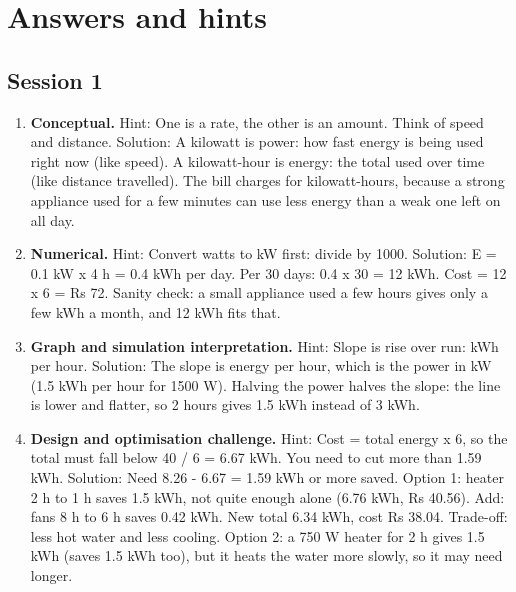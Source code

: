 \documentclass[11pt,a4paper]{article}
\begin{document}
\section{Answers and hints}

\subsection*{Session 1}
\begin{enumerate}[nosep]
\item \textbf{Conceptual.} Hint: One is a rate, the other is an amount. Think of speed and distance. Solution: A kilowatt is power: how fast energy is being used right now (like speed). A kilowatt-hour is energy: the total used over time (like distance travelled). The bill charges for kilowatt-hours, because a strong appliance used for a few minutes can use less energy than a weak one left on all day.
\item \textbf{Numerical.} Hint: Convert watts to kW first: divide by 1000. Solution: E = 0.1 kW x 4 h = 0.4 kWh per day. Per 30 days: 0.4 x 30 = 12 kWh. Cost = 12 x 6 = Rs 72. Sanity check: a small appliance used a few hours gives only a few kWh a month, and 12 kWh fits that.
\item \textbf{Graph and simulation interpretation.} Hint: Slope is rise over run: kWh per hour. Solution: The slope is energy per hour, which is the power in kW (1.5 kWh per hour for 1500 W). Halving the power halves the slope: the line is lower and flatter, so 2 hours gives 1.5 kWh instead of 3 kWh.
\item \textbf{Design and optimisation challenge.} Hint: Cost = total energy x 6, so the total must fall below 40 / 6 = 6.67 kWh. You need to cut more than 1.59 kWh. Solution: Need 8.26 - 6.67 = 1.59 kWh or more saved. Option 1: heater 2 h to 1 h saves 1.5 kWh, not quite enough alone (6.76 kWh, Rs 40.56). Add: fans 8 h to 6 h saves 0.42 kWh. New total 6.34 kWh, cost Rs 38.04. Trade-off: less hot water and less cooling. Option 2: a 750 W heater for 2 h gives 1.5 kWh (saves 1.5 kWh too), but it heats the water more slowly, so it may need longer.
\end{enumerate}
\end{document}
